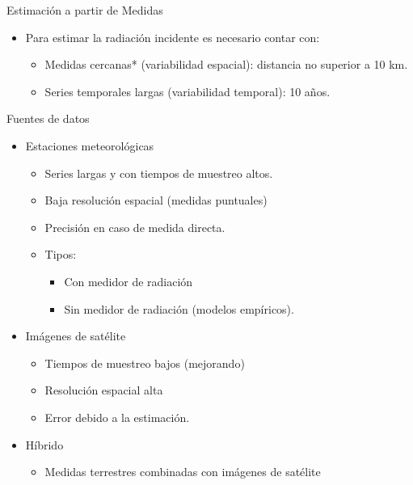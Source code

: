\documentclass[xcolor={usenames,svgnames,dvipsnames}]{beamer}
\begin{document}
\begin{frame}[label=sec-6-1-6]{Estimación a partir de Medidas}
\begin{itemize}
\item Para estimar la radiación incidente es necesario contar con:
\begin{itemize}
\item \alert{Medidas cercanas*} (variabilidad espacial): distancia no superior a 10 km.
\item \alert{Series temporales} largas (variabilidad temporal): 10 años.
\end{itemize}
\end{itemize}
\end{frame}

\begin{frame}[label=sec-6-1-7]{Fuentes de datos}
\begin{itemize}
\item \alert{Estaciones meteorológicas}
\begin{itemize}
\item Series largas y con tiempos de muestreo altos.
\item Baja resolución espacial (medidas puntuales)
\item Precisión en caso de medida directa.
\item Tipos: 
\begin{itemize}
\item Con medidor de radiación
\item Sin medidor de radiación (modelos empíricos).
\end{itemize}
\end{itemize}
\end{itemize}

\pause

\begin{itemize}
\item \alert{Imágenes de satélite}

\begin{itemize}
\item Tiempos de muestreo bajos (mejorando)

\item Resolución espacial alta

\item Error debido a la estimación.
\end{itemize}
\end{itemize}

\pause 

\begin{itemize}
\item \alert{Híbrido}

\begin{itemize}
\item Medidas terrestres combinadas con imágenes de satélite
\end{itemize}
\end{itemize}
\end{frame}
\end{document}
